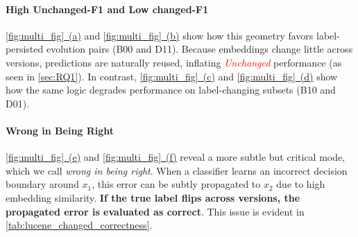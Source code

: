 \documentclass[authoryear,final,5p,times,twocolumn]{elsarticle}
\theoremstyle{plain}
\begin{document}
\paragraph{High Unchanged-F1 and Low changed-F1} \autoref{fig:multi_fig}\hyperref[fig:multi_fig]{~(a)} and \autoref{fig:multi_fig}\hyperref[fig:multi_fig]{~(b)} show how this geometry favors label-persisted evolution pairs (B00 and D11). 
Because embeddings change little across versions, predictions are naturally reused, inflating \textcolor{red}{\emph{Unchanged}} performance (as seen in \autoref{sec:RQ1}). In contrast, \autoref{fig:multi_fig}\hyperref[fig:multi_fig]{~(c)} and \autoref{fig:multi_fig}\hyperref[fig:multi_fig]{~(d)} show how the same logic degrades performance on label-changing subsets (B10 and D01).

\paragraph{Wrong in Being Right} \autoref{fig:multi_fig}\hyperref[fig:multi_fig]{~(e)} and \autoref{fig:multi_fig}\hyperref[fig:multi_fig]{~(f)} reveal a more subtle but critical mode, which we call \emph{wrong in being right}. When a classifier learns an incorrect decision boundary around $x_1$, this error can be subtly propagated to $x_2$ due to high embedding similarity. \textbf{If the true label flips across versions, the propagated error is evaluated as correct}. This issue is evident in \autoref{tab:lucene_changed_correctness}. 

\begin{table}[!htbp]
\centering
\renewcommand{\arraystretch}{1.5} 
\setlength{\tabcolsep}{12pt} 
\caption{Train–test correctness matrices for the weak linear SVM model on B10 and D01 subsets of common files. Changed-F1 scores are: 0.551 (train), 0.381 (test), and 0.0 (test without propagated errors).}
\label{tab:lucene_changed_correctness}
\end{table}
\end{document}
